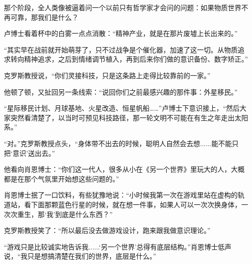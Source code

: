 那个阶段，全人类像被逼着问一个以前只有哲学家才会问的问题：如果物质世界不再可靠，那我们是什么？

卢博士看着杯中的白雾一点点消散：“精神产业，就是在那片废墟上长出来的。”

“其实早在战前就开始萌芽了，只不过战争是个催化器，加速了这一切。从物质追求转向精神追求，之后到情绪调节植入，再到后来你们做的意识备份、数字矫正。”

克罗斯教授说，“你们灵接科技，只是这条路上走得比较靠前的一家。”

他顿了顿，又扯回另一条线索：“说回你们之前最感兴趣的那件事：外星移民。”

“星际移民计划、月球基地、火星改造、恒星帆船……”卢博士下意识接上，“然后大家突然看清楚了，以当时可预见科技路径，那一轮文明不可能在有生之年走出太阳系。”

“对。”克罗斯教授点头，“身体带不出去的时候，聪明人自然会去想......能不能只把‘意识’送出去。”

他看向肖恩博士：“你们这一代人，很多从小在《另一个世界》里玩大的人，大概都是在那个气氛里开始想这些问题的。”

肖恩博士抿了一口饮料，有些犹豫地说：“小时候我第一次在游戏里站在虚构的轨道站，看下面那颗蓝色行星的时候，就在想一件事，如果人可以一次次换身体，一次次重生，那‘我’到底是什么东西？”

克罗斯教授笑了：“所以最后没去做游戏设计，跑来跟我做意识理论。”

“游戏只是比较诚实地告诉我......‘另一个世界’总得有底层结构。”肖恩博士低声说，“我只是想搞清楚在我们的世界，底层是什么。”
